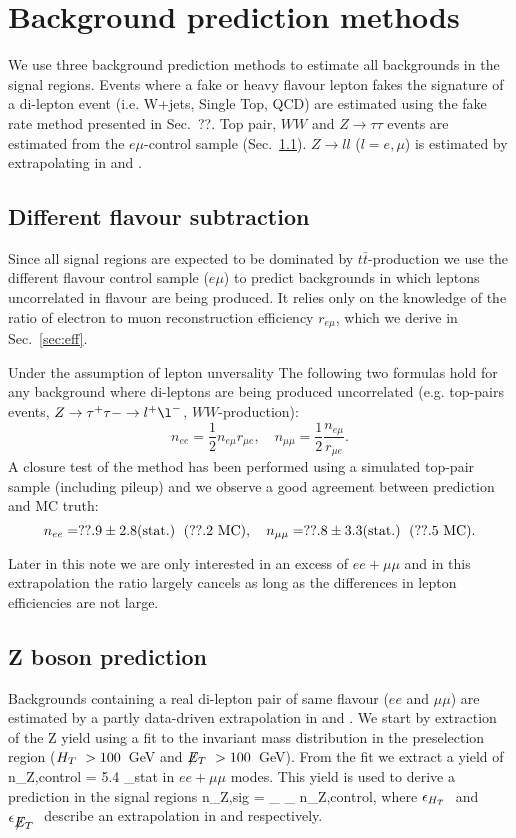 \section{Background prediction methods}

We use three background prediction methods to
estimate all backgrounds in the signal regions.
Events where a fake or heavy flavour lepton
fakes the signature of a di-lepton event (i.e. W+jets, Single Top,
QCD) are estimated using the fake rate method 
presented in Sec.~??.
Top pair, $WW$ and $Z \rightarrow \tau \tau$ events
are estimated from the $e\mu$-control sample (Sec.~\ref{sec:ofossubtraction}).
$Z\rightarrow ll$ ($l=e,\mu$) is estimated by
extrapolating in \HT and \MET.

\subsection{Different flavour subtraction} \label{sec:ofossubtraction}
Since all signal regions are expected to be  
dominated by $t\bar{t}$-production we use
the different flavour control sample ($e\mu$) to predict
backgrounds in which leptons uncorrelated in flavour are being produced.
It relies only on the knowledge of the ratio
of electron to muon reconstruction efficiency $r_{e\mu}$,
which we derive in Sec.~\ref{sec:eff}.

Under the assumption of lepton unversality
The following two formulas hold for any background
where di-leptons are being produced uncorrelated 
(e.g. top-pairs events, $Z \rightarrow \tau^{+} \tau{-} \rightarrow 
l^{+} \l^-$, $WW$-production):
$$
n_{ee} = \frac12n_{e\mu}r_{\mu{}e}, \quad n_{\mu\mu} = \frac12\frac{n_{e\mu}}{r_{\mu{}e}}.
$$
A closure test of the method has been performed
using a simulated top-pair sample (including pileup) and
we observe a good agreement between prediction and MC truth:
$$
n_{ee} = ??.9 \pm 2.8 (\textnormal{stat.}) \; \textnormal{ (??.2 MC)}, 
\quad n_{\mu\mu} = ??.8 \pm 3.3 (\textnormal{stat.}) \; \textnormal{ (??.5 MC)}.
$$

Later in this note we are only interested
in an excess of $ee+\mu\mu$ and in this
extrapolation the ratio largely cancels
as long as the differences in lepton efficiencies are not
large.

\subsection{Z boson prediction} \label{sec:zprediction}

Backgrounds containing a real di-lepton pair of same flavour ($ee$ and $\mu\mu$)
are estimated by a partly data-driven extrapolation in \HT and \MET.
We start by extraction of the Z yield using a fit to the invariant
mass distribution in the preselection region ($H_T~ > 100$~GeV and $\displaystyle{\not} E_T~>100$~GeV).
From the fit we extract a yield of 
\be
    n_{Z,control} = 5.4 _{stat}
\ee
in $ee+\mu\mu$ modes. This yield is used
to derive a prediction in the signal regions
\be
    n_{Z,sig} = \epsilon_{\HT} \epsilon_{\MET} n_{Z,control},
\ee
where $\epsilon_{H_T~}$ and $\epsilon_{\displaystyle{\not} E_T~}$ describe
an extrapolation in \HT and \MET respectively.

